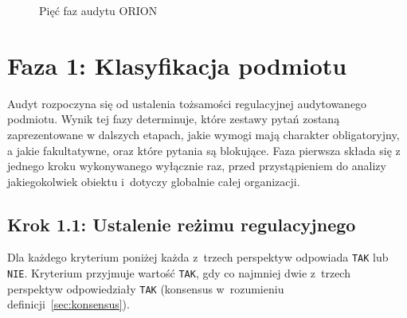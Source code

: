 \begin{figure}[H]
\centering
{}
\caption{Pięć faz audytu ORION}
\label{fig:fazy-audytu}
\end{figure}

\section{Faza 1: Klasyfikacja podmiotu}
\label{sec:faza1}

Audyt rozpoczyna się od ustalenia tożsamości regulacyjnej audytowanego podmiotu. Wynik tej fazy determinuje, które zestawy pytań zostaną zaprezentowane w dalszych etapach, jakie wymogi mają charakter obligatoryjny, a jakie fakultatywne, oraz które pytania są blokujące. 
Faza pierwsza składa się z jednego kroku wykonywanego wyłącznie raz, przed przystąpieniem do analizy jakiegokolwiek obiektu i~dotyczy globalnie całej organizacji.

\subsection{Krok 1.1: Ustalenie reżimu regulacyjnego}
\label{sec:krok11}

Dla każdego kryterium poniżej każda z~trzech perspektyw odpowiada \texttt{TAK} lub \texttt{NIE}. Kryterium przyjmuje wartość \texttt{TAK}, gdy co najmniej dwie z~trzech perspektyw odpowiedziały \texttt{TAK} (konsensus w~rozumieniu definicji~\ref{sec:konsensus}).

\bigskip

